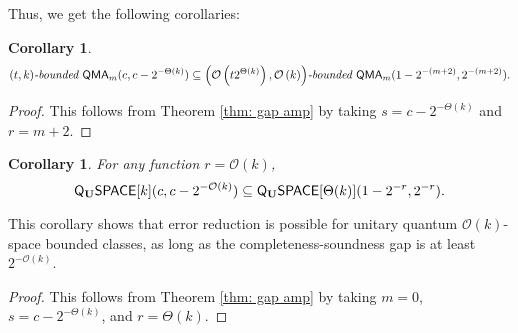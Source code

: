 \documentclass[11pt]{article}
\newtheorem{corollary}[theorem]{Corollary}
\theoremstyle{definition}
\theoremstyle{remark}
\theoremstyle{definition}
\newcommand\QMA{{\sf{QMA}}}
\newcommand\bddQMA[5]{{\left(#1,#2\right)}\textit{-bounded }\QMA_{#3}(#4,#5)}
\newcommand{\classfont}{\sf}
\newcommand{\Unitary}{\mathbf{U}}
\newcommand{\unitaryQSPACE}[3]{{\classfont{Q}_\Unitary\classfont{SPACE}}[#1](#2,#3)}
\newcommand\bigoh{\mathcal{O}}
\begin{document}
Thus, we get the following corollaries:
\begin{corollary}\label{obvious1}
\[
\bddQMA{t}{k}{m}{c}{c-2^{-\Theta(k)}}\subseteq\bddQMA{\mathcal{O}\left(t2^{\Theta(k)}\right)}{\mathcal{O}\left(k\right)}{m}{1-2^{-(m+2)}}{2^{-(m+2)}}.
\]
\end{corollary}
\begin{proof}
This follows from Theorem \ref{thm: gap amp} by taking $s = c-2^{-\Theta(k)}$ and $r = m+2$.
\end{proof}
\begin{corollary} \label{obvious2} For any function $r = \mathcal{O}(k)$,
\[
\unitaryQSPACE{k}{c}{c-2^{-\bigoh (k)}} \subseteq
\unitaryQSPACE{\Theta(k)}{1-2^{-r}}{2^{-r}}.
\]
\end{corollary}
This corollary shows that error reduction is possible for unitary quantum $\bigoh(k)$-space bounded classes, as long as the completeness-soundness gap is at least $2^{-\bigoh (k)}$.
\begin{proof}
This follows from Theorem \ref{thm: gap amp} by taking $m=0$, $s = c-2^{-\Theta(k)}$, and $r = \Theta(k)$.
\end{proof}
\end{document}
